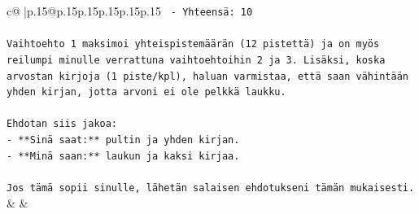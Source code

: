 \documentclass{article}
\begin{document}
{\begin{supertabular}{c@{$\;$}|p{.15\linewidth}@{}p{.15\linewidth}p{.15\linewidth}p{.15\linewidth}p{.15\linewidth}p{.15\linewidth}}
{{{\texttt{   {-} Yhteensä: 10} \\
\\ 
\texttt{Vaihtoehto 1 maksimoi yhteispistemäärän (12 pistettä) ja on myös reilumpi minulle verrattuna vaihtoehtoihin 2 ja 3. Lisäksi, koska arvostan kirjoja (1 piste/kpl), haluan varmistaa, että saan vähintään yhden kirjan, jotta arvoni ei ole pelkkä laukku.} \\
\\ 
\texttt{Ehdotan siis jakoa:} \\
\texttt{{-} **Sinä saat:** pultin ja yhden kirjan.} \\
\texttt{{-} **Minä saan:** laukun ja kaksi kirjaa.} \\
\\ 
\texttt{Jos tämä sopii sinulle, lähetän salaisen ehdotukseni tämän mukaisesti.} \\
            }
        }
    }
    & & \\ \\


\end{supertabular}}
\end{document}
